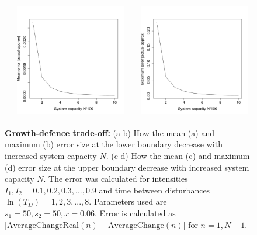 \documentclass[a4paper]{article}
\begin{document}
\begin{figure}[th]
\begin{tabular}{rrrr}
  &\includegraphics[width=2.5in]{GDtmeanerr.pdf} && \includegraphics[width=2.5in]{GDtmaxerr.pdf} \end{tabular}
   \caption[Errors in approximating average change: growth-defence trade-off]{\textbf{Growth-defence trade-off:} (a-b)  How the mean (a) and maximum (b)  error size at the lower boundary decrease with increased system capacity $N$. (c-d) How the mean (c) and maximum (d) error size at the upper boundary decrease with increased system capacity $N$. The error was calculated for intensities $I_1,I_2=0.1,0.2,0.3,...,0.9$ and time between disturbances $\ln(T_D)=1,2,3,...,8.$ Parameters used are $s_1=50,s_2=50,x=0.06$. Error is calculated as $| \text{AverageChangeReal}(n) - \text{AverageChange}(n) |$ for $n=1,N-1$.}
     \label{fig:growthdefenceerrors}
    \end{figure}
\end{document}
